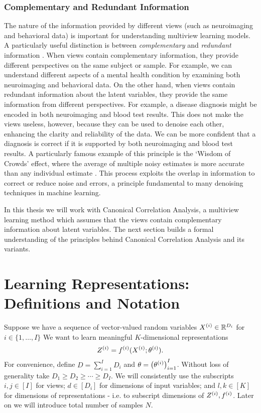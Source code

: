 \subsubsection{Complementary and Redundant Information}
The nature of the information provided by different \gls{views} (such as neuroimaging and behavioral data) is important for understanding multiview learning models.
A particularly useful distinction is between \textit{complementary} and \textit{redundant} information \citep{nguyen2020multiview}.
When views contain complementary information, they provide different perspectives on the same subject or sample.
For example, we can understand different aspects of a mental health condition by examining both neuroimaging and behavioral data.
On the other hand, when \gls{views} contain redundant information about the latent variables, they provide the same information from different perspectives.
For example, a disease diagnosis might be encoded in both neuroimaging and blood test results.
This does not make the \gls{views} useless, however, because they can be used to denoise each other, enhancing the clarity and reliability of the data. We can be more confident that a diagnosis is correct if it is supported by both neuroimaging and blood test results.
A particularly famous example of this principle is the `Wisdom of Crowds' effect, where the average of multiple noisy estimates is more accurate than any individual estimate \citep{galton1907vox}.
This process exploits the overlap in information to correct or reduce noise and errors, a principle fundamental to many denoising techniques in machine learning.

In this thesis we will work with Canonical Correlation Analysis, a multiview learning method which assumes that the \gls{views} contain complementary information about latent variables.
The next section builds a formal understanding of the principles behind Canonical Correlation Analysis and its variants.

\section{Learning Representations: Definitions and Notation}

Suppose we have a sequence of vector-valued random variables $X^{(i)} \in \mathbb{R}^{D_i}$ for $i \in \{1, \dots, I \}$
We want to learn meaningful $K$-dimensional representations
\begin{equation}
    \label{eq:general-form-of-representations}
    Z^{(i)} = f^{(i)}( X^{(i)}; \theta^{(i)}).
\end{equation}
For convenience, define $D = \sum_{i=1}^I D_i$ and $\theta = \left(\theta^{(i)}\right)_{i=1}^I$.
Without loss of generality take $D_1 \geq D_2 \geq \cdots \geq D_I$.
We will consistently use the subscripts $i,j \in [I]$ for \gls{views};
$d \in [D_i]$ for dimensions of input variables;
and $l,k \in [K]$ for dimensions of representations - i.e. to subscript dimensions of $Z^{(i)}, f^{(i)}$.
Later on we will introduce total number of samples $N$.

